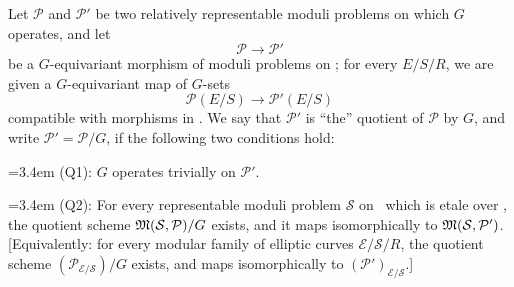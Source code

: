 \kmitem\label{item:7.1.2}
Let $\mathcal{P}$ and $\mathcal{P}'$ be two relatively representable moduli problems on which $G$ operates, and let
\[
\mathcal{P} \to \mathcal{P}'
\]
be a $G$-equivariant morphism of moduli problems on \EllR; for every $E/S/R$, we are given a $G$-equivariant map of $G$-sets
\[
\mathcal{P}(E/S) \to \mathcal{P}'(E/S)
\]
compatible with morphisms in \EllR. We say that $\mathcal{P}'$ is ``the'' quotient of $\mathcal{P}$ by $G$, and write $\mathcal{P}' = \mathcal{P}/G$, if the following two conditions hold:
\begin{kmindent}
\noindent\hangindent=3.4em (Q1): $G$ operates trivially on $\mathcal{P}'$.

\noindent\hangindent=3.4em (Q2): For every representable moduli problem $\mathcal{S}$ on \EllR\ which is etale over \EllR, the quotient scheme $\mathfrak{M}(\mathcal{S},\mathcal{P})/G$ exists, and it maps isomorphically to $\mathfrak{M}(\mathcal{S},\mathcal{P}')$. [Equivalently: for every modular family of elliptic curves $\mathcal{E}/\mathcal{S}/R$, the quotient scheme $(\mathcal{P}_{\mathcal{E}/\mathcal{S}})/G$ exists, and maps isomorphically to $(\mathcal{P}')_{\mathcal{E}/\mathcal{S}}$.]
\end{kmindent}


